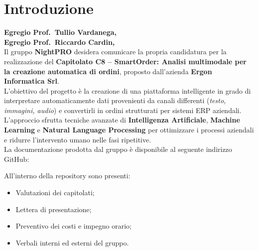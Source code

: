 \documentclass[a4paper, 11pt, oneside]{scrartcl} %
\begin{document}


\newpage
\section{Introduzione}

\noindent
\textbf{Egregio Prof.~Tullio Vardanega,}\\
\textbf{Egregio Prof.~Riccardo Cardin,}\\[0.6em]

\noindent
Il gruppo \textbf{NightPRO} desidera comunicare la propria candidatura per la realizzazione del \textbf{Capitolato C8 – SmartOrder: Analisi multimodale per la creazione automatica di ordini}, proposto dall’azienda \textbf{Ergon Informatica Srl}.\\[0.6em]
\noindent
L’obiettivo del progetto è la creazione di una piattaforma intelligente in grado di interpretare automaticamente dati provenienti da canali differenti (\textit{testo, immagini, audio}) e convertirli in ordini strutturati per sistemi ERP aziendali. \\[0.6em]
L’approccio sfrutta tecniche avanzate di \textbf{Intelligenza Artificiale}, \textbf{Machine Learning} e \textbf{Natural Language Processing} per ottimizzare i processi aziendali e ridurre l’intervento umano nelle fasi ripetitive.\\[0.6em]

La documentazione prodotta dal gruppo è disponibile al seguente indirizzo GitHub:

\begin{center}

\end{center}

All’interno della repository sono presenti:
\begin{itemize}
    \item Valutazioni dei capitolati;
    \item Lettera di presentazione;
    \item Preventivo dei costi e impegno orario;
    \item Verbali interni ed esterni del gruppo.
\end{itemize}


\newpage
\end{document}
